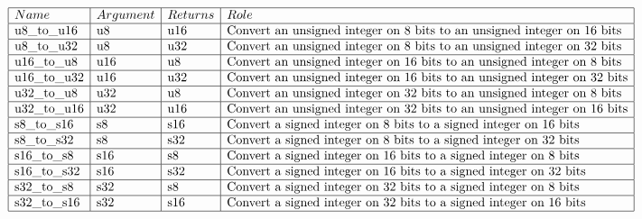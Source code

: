 \documentclass{scrartcl}
\begin{document}
$\begin{array}{|l|l|l|l|}
\hline
Name & Argument & Returns & Role\\
\hline
\text{u8\_to\_u16} & \text{u8} & \text{u16} & \text{Convert an unsigned integer on 8 bits to an unsigned integer on 16 bits}\\
\hline
\text{u8\_to\_u32} & \text{u8} & \text{u32} & \text{Convert an unsigned integer on 8 bits to an unsigned integer on 32 bits}\\
\hline
\text{u16\_to\_u8} & \text{u16} & \text{u8} & \text{Convert an unsigned integer on 16 bits to an unsigned integer on 8 bits}\\
\hline
\text{u16\_to\_u32} & \text{u16} & \text{u32} & \text{Convert an unsigned integer on 16 bits to an unsigned integer on 32 bits}\\
\hline
\text{u32\_to\_u8} & \text{u32} & \text{u8} & \text{Convert an unsigned integer on 32 bits to an unsigned integer on 8 bits}\\
\hline
\text{u32\_to\_u16} & \text{u32} & \text{u16} & \text{Convert an unsigned integer on 32 bits to an unsigned integer on 16 bits}\\
\hline
\text{s8\_to\_s16} & \text{s8} & \text{s16} & \text{Convert a signed integer on 8 bits to a signed integer on 16 bits}\\
\hline
\text{s8\_to\_s32} & \text{s8} & \text{s32} & \text{Convert a signed integer on 8 bits to a signed integer on 32 bits}\\
\hline
\text{s16\_to\_s8} & \text{s16} & \text{s8} & \text{Convert a signed integer on 16 bits to a signed integer on 8 bits}\\
\hline
\text{s16\_to\_s32} & \text{s16} & \text{s32} & \text{Convert a signed integer on 16 bits to a signed integer on 32 bits}\\
\hline
\text{s32\_to\_s8} & \text{s32} & \text{s8} & \text{Convert a signed integer on 32 bits to a signed integer on 8 bits}\\
\hline
\text{s32\_to\_s16} & \text{s32} & \text{s16} & \text{Convert a signed integer on 32 bits to a signed integer on 16 bits}\\
\hline
\end{array}$
\end{document}
